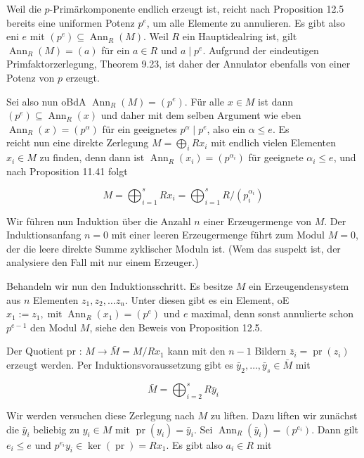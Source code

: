 \documentclass[10pt, letterpaper]{article}
\begin{document}
Weil die $p$-Primärkomponente endlich erzeugt ist, reicht nach Proposition 12.5 bereits eine uniformen Potenz $p^{e}$, um alle Elemente zu annulieren. Es gibt also eni $e$ mit $\left(p^{e}\right) \subseteq \operatorname{Ann}_{R}(M)$. Weil $R$ ein Hauptidealring ist, gilt $\operatorname{Ann}_{R}(M)=(a)$ für ein $a \in R$ und $a \mid p^{e}$. Aufgrund der eindeutigen Primfaktorzerlegung, Theorem 9.23, ist daher der Annulator ebenfalls von einer Potenz von $p$ erzeugt.

Sei also nun oBdA $\operatorname{Ann}_{R}(M)=\left(p^{e}\right)$. Für alle $x \in M$ ist dann $\left(p^{e}\right) \subseteq \operatorname{Ann}_{R}(x)$ und daher mit dem selben Argument wie eben $\operatorname{Ann}_{R}(x)=\left(p^{\alpha}\right)$ für ein geeignetes $p^{\alpha} \mid p^{e}$, also ein $\alpha \leq e$. Es\\
reicht nun eine direkte Zerlegung $M=\bigoplus_{i} R x_{i}$ mit endlich vielen Elementen $x_{i} \in M$ zu finden, denn dann ist $\operatorname{Ann}_{R}\left(x_{i}\right)=\left(p^{\alpha_{i}}\right)$ für geeignete $\alpha_{i} \leq e$, und nach Proposition 11.41 folgt

$$
M=\bigoplus_{i=1}^{s} R x_{i}=\bigoplus_{i=1}^{s} R /\left(p_{i}^{\alpha_{i}}\right)
$$

Wir führen nun Induktion über die Anzahl $n$ einer Erzeugermenge von $M$. Der Induktionsanfang $n=0$ mit einer leeren Erzeugermenge führt zum Modul $M=0$, der die leere direkte Summe zyklischer Moduln ist. (Wem das suspekt ist, der analysiere den Fall mit nur einem Erzeuger.)

Behandeln wir nun den Induktionsschritt. Es besitze $M$ ein Erzeugendensystem aus $n$ Elementen $z_{1}, z_{2}, \ldots z_{n}$. Unter diesen gibt es ein Element, oE $x_{1}:=z_{1}, \operatorname{mit} \operatorname{Ann}_{R}\left(x_{1}\right)=\left(p^{e}\right)$ und $e$ maximal, denn sonst annulierte schon $p^{e-1}$ den Modul $M$, siehe den Beweis von Proposition 12.5.

Der Quotient pr : $M \rightarrow \bar{M}=M / R x_{1}$ kann mit den $n-1$ Bildern $\bar{z}_{i}=\operatorname{pr}\left(z_{i}\right)$ erzeugt werden. Per Induktionsvoraussetzung gibt es $\bar{y}_{2}, \ldots, \bar{y}_{s} \in \bar{M}$ mit

$$
\bar{M}=\bigoplus_{i=2}^{s} R \bar{y}_{i}
$$

Wir werden versuchen diese Zerlegung nach $M$ zu liften. Dazu liften wir zunächst die $\bar{y}_{i}$ beliebig zu $y_{i} \in M$ mit $\operatorname{pr}\left(y_{i}\right)=\bar{y}_{i}$. Sei $\operatorname{Ann}_{R}\left(\bar{y}_{i}\right)=\left(p^{e_{i}}\right)$. Dann gilt $e_{i} \leq e$ und $p^{e_{i}} y_{i} \in \operatorname{ker}(\operatorname{pr})=R x_{1}$. Es gibt also $a_{i} \in R$ mit
\end{document}
